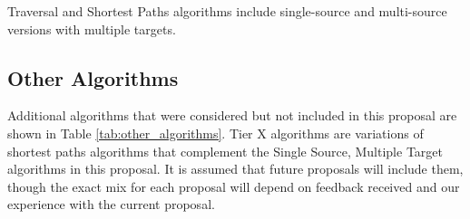 Traversal and Shortest Paths algorithms include single-source and multi-source versions with multiple targets.

\subsection{Other Algorithms}
Additional algorithms that were considered but not included in this proposal are shown in Table \ref{tab:other_algorithms}. 
Tier X algorithms are variations of shortest paths algorithms that complement the Single Source, Multiple Target algorithms 
in this proposal.
It is assumed that future proposals will include them, though the exact mix for each proposal will depend on feedback received
and our experience with the current proposal.


